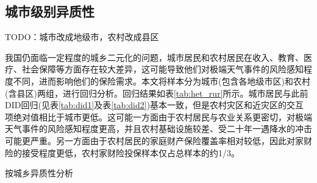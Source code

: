 \subsection{城市级别异质性}
TODO：城市改成地级市，农村改成县区

我国仍面临一定程度的城乡二元化的问题，城市居民和农村居民在收入、教育、医疗、社会保障等方面存在较大差异，这可能导致他们对极端天气事件的风险感知程度不同，进而影响他们的保险需求。本文将样本分为城市(包含各地级市区)和农村(含县区)两组，进行回归分析。回归结果如表\ref{tab:het_rur}所示。城市居民与此前DID回归(见表\ref{tab:did1}及表\ref{tab:did2})基本一致，但是农村灾区和近灾区的交互项绝对值相比于城市更低。这可能一方面由于农村居民与农业关系更密切，对极端天气事件的风险感知程度更高，并且农村基础设施较差、受二十年一遇降水的冲击可能更严重。另一方面由于农村居民的家庭财产保险覆盖率相对较低\citep{falco2014crop,胡新艳2021气候变化,TJLT202108007}，因此对家财险的接受程度更低，农村家财险投保样本仅占总样本的约1/3。

\begin{table}[ht]
    \centering
    \caption{按城乡异质性分析}\label{tab:het_rur}
    
\end{table}
